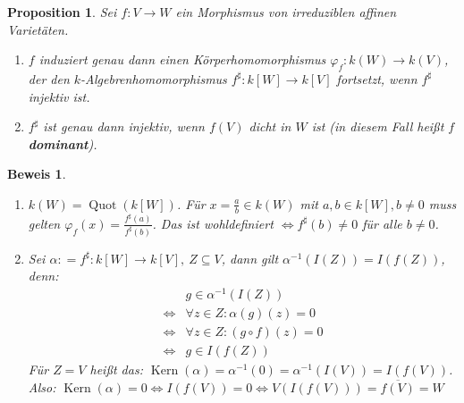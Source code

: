 \documentclass[a4paper,12pt]{report}
\theoremstyle{break}
\newtheorem{Prop}[Def]{Proposition}
\theoremstyle{nonumberbreak}
\theoremstyle{nonumberplain}
\newtheorem{Bew}{Beweis}
\newcommand{\emp}[1]{\textbf{\emph{#1}}}
\newcommand{\begriff}[1]{{\index{#1}}\emp{#1}}
\newcommand{\defeqr}[0]{\mathrel{\mathop:}=}
\DeclareMathOperator{\Quot}{Quot}
\DeclareMathOperator{\Kern}{Kern}
\begin{document}
\begin{Prop}
  \label{prop:6.12}
  Sei $f:V\longrightarrow W$ ein Morphismus von irreduziblen affinen Varietäten.
  \begin{enumerate}
  \item $f$ induziert genau dann einen Körperhomomorphismus $\varphi_f:k(W)\longrightarrow k(V)$, der den $k$-Algebrenhomomorphismus $f^\sharp:k[W]\longrightarrow k[V]$ fortsetzt, wenn $f^\sharp$ injektiv ist.
  \item $f^\sharp$ ist genau dann injektiv, wenn $f(V)$ dicht in $W$ ist (in diesem Fall heißt $f$ \begriff{dominant}).
  \end{enumerate}
\end{Prop}
\begin{Bew}~\\
  \begin{enumerate}
  \item $k(W)=\Quot(k[W])$. Für $x=\frac{a}{b}\in k(W)$ mit $a,b\in k[W],b\neq 0$ muss gelten $\varphi_f(x)=\frac{f^\sharp(a)}{f^\sharp(b)}$. Das ist wohldefiniert $\Leftrightarrow f^\sharp(b)\neq 0$ für alle $b\neq 0$.
  \item Sei $\alpha\defeqr f^\sharp:k[W]\longrightarrow k[V], ~Z\subseteq V$, dann gilt $\alpha^{-1}(I(Z))=I(f(Z))$, denn: \\
    \begin{align*}
      &g\in\alpha^{-1}(I(Z)) \\
      \Leftrightarrow&\forall z\in Z:\alpha(g)(z)=0 \\
      \Leftrightarrow&\forall z\in Z:(g\circ f)(z)=0 \\
      \Leftrightarrow&g\in I(f(Z))
    \end{align*}
    Für $Z=V$ heißt das: $\Kern(\alpha)=\alpha^{-1}(0)=\alpha^{-1}(I(V))=I(f(V))$. Also: $\Kern(\alpha)=0 \Leftrightarrow I(f(V))=0 \Leftrightarrow V(I(f(V)))=\overline{f(V)}=W$
  \end{enumerate}
\end{Bew}
\end{document}
